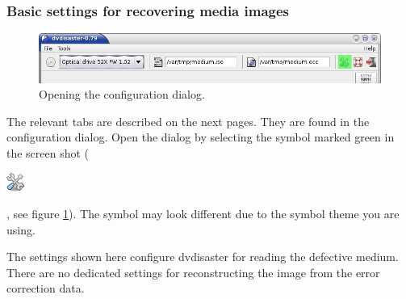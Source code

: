 
\vspace{10mm}

\subsubsection{Basic settings for recovering media images}
\label{howto-recover-basic-settings}

\begin{figure}[h]
\centerline{\includegraphics[width=\textwidth]{screenshots/global-prefs-invoke.png}}
\caption{Opening the configuration dialog.}  
\label{howto-recover-open-preferences}
\end{figure}

The relevant tabs are described on the next pages. They are
found in the configuration dialog.
Open the dialog by selecting the symbol marked green in the
screen shot ( \begin{minipage}{8mm}\includegraphics{icons/prefs-icon.png}\end{minipage}, see figure \ref{howto-recover-open-preferences}).
The symbol may look different due to the symbol theme you are using.

\bigskip

The settings shown here configure dvdisaster for reading the defective
medium. There are no dedicated settings for reconstructing the image
from the error correction data. 

\newpage

